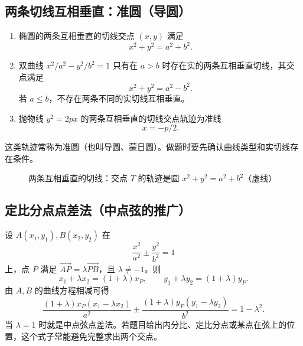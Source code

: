 \documentclass[UTF8,zihao=-4,a4paper]{ctexart}
\begin{document}
\subsection{两条切线互相垂直：准圆（导圆）}

\begin{enumerate}
\item 椭圆的两条互相垂直的切线交点 $(x,y)$ 满足
\[
\boxed{x^2+y^2=a^2+b^2}.
\]
\item 双曲线 $x^2/a^2-y^2/b^2=1$ 只有在 $a>b$ 时存在实的两条互相垂直切线，其交点满足
\[
\boxed{x^2+y^2=a^2-b^2}.
\]
若 $a\le b$，不存在两条不同的实切线互相垂直。
\item 抛物线 $y^2=2px$ 的两条互相垂直的切线交点轨迹为准线
\[
\boxed{x=-p/2}.
\]
\end{enumerate}
这类轨迹常称为准圆（也叫导圆、蒙日圆）。做题时要先确认曲线类型和实切线存在条件。

\begin{figure}[H]
\centering
{}
\caption{两条互相垂直的切线：交点 $T$ 的轨迹是圆 $x^2+y^2=a^2+b^2$（虚线）}
\end{figure}

\subsection{定比分点点差法（中点弦的推广）}

设 $A(x_1,y_1),B(x_2,y_2)$ 在
\[
\frac{x^2}{a^2}\pm\frac{y^2}{b^2}=1
\]
上，点 $P$ 满足 $\overrightarrow{AP}=\lambda\overrightarrow{PB}$，且 $\lambda\ne-1$。则
\[
x_1+\lambda x_2=(1+\lambda)x_P,\qquad
y_1+\lambda y_2=(1+\lambda)y_P.
\]
由 $A,B$ 的曲线方程相减可得
\[
\boxed{
\frac{(1+\lambda)x_P(x_1-\lambda x_2)}{a^2}
\pm
\frac{(1+\lambda)y_P(y_1-\lambda y_2)}{b^2}
=1-\lambda^2.}
\]
当 $\lambda=1$ 时就是中点弦点差法。若题目给出内分比、定比分点或某点在弦上的位置，这个式子常能避免完整求出两个交点。
\end{document}

